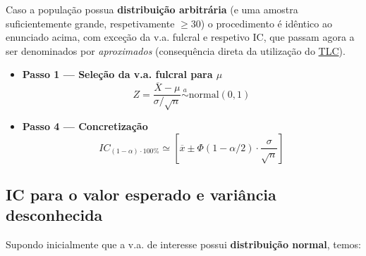 \newpage
\noindent Caso a população possua \textbf{distribuição arbitrária} (e uma amostra suficientemente grande, respetivamente $\ge 30$) o procedimento é idêntico ao enunciado acima, com exceção da v.a. fulcral e respetivo IC, que passam agora a ser denominados por \textit{aproximados} (consequência direta da utilização do  \hyperref[def:tlc]{TLC}).

\begin{itemize}[leftmargin=*,noitemsep]
    \item \textbf{Passo 1 --- Seleção da v.a. fulcral para $\mu$}
    $$
        Z = \dfrac{\overline{X} - \mu}{\sigma/\sqrt{n}} \overset{a}{\sim} \text{normal}(0,1)
    $$
    \item\textbf{Passo 4 --- Concretização}
    $$
        IC_{(1 - \alpha)\cdot 100\%} \simeq \left[\overline{x} \pm \Phi(1 - \alpha/2) \cdot \dfrac{\sigma}{\sqrt{n}}\right]
    $$
\end{itemize}

\subsection[5.2 IC para o valor esperado e variância desconhecida]{\hspace*{0.075 em}\raisebox{0.2 em}{$\pmb{\drsh}$} IC para o valor esperado e variância desconhecida}

\noindent Supondo inicialmente que a v.a. de interesse possui \textbf{distribuição normal}, temos:

